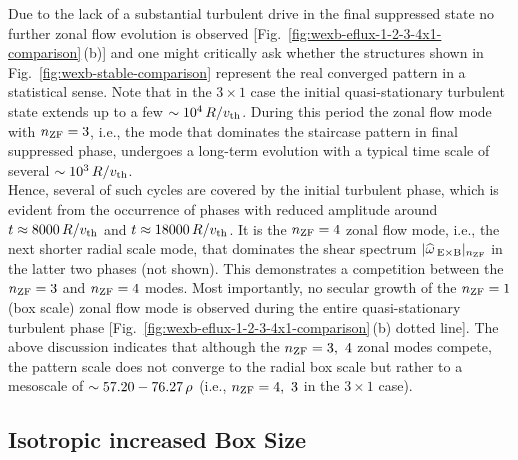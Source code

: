 Due to the lack of a substantial turbulent drive in the final suppressed state no further zonal flow evolution is observed [Fig.~\ref{fig:wexb-eflux-1-2-3-4x1-comparison}\,(b)] and one might critically ask whether the structures shown in Fig.~\ref{fig:wexb-stable-comparison} represent the real converged pattern in a statistical sense. 
Note that in the $3 \times 1$ case the initial quasi-stationary turbulent state extends up to a few $\sim 10^4\,R/v_{\mathrm{th}}$.
During this period the zonal flow mode with $n_\mathrm{ZF} = 3$, i.e., the mode that dominates the staircase pattern in final suppressed phase, undergoes a long-term evolution with a typical time scale of several $\sim 10^3\,R/v_{\mathrm{th}}$. \\
Hence, several of such cycles are covered by the initial turbulent phase, which is evident from the occurrence of phases with reduced amplitude around $t \approx 8000\,R/v_{\mathrm{th}}$ and $t \approx 18000\,    R/v_{\mathrm{th}}$.
It is the $n_\mathrm{ZF} = 4$ zonal flow mode, i.e., the next shorter radial scale mode, that dominates the shear spectrum $|\widehat{\omega}_{\mathrm{\:E \times B}}|_{n_\mathrm{ZF}}$ in the latter two phases (not shown). This demonstrates a competition between the $n_\mathrm{ZF} = 3$ and $n_\mathrm{ZF} = 4$ modes.
Most importantly, no secular growth of the $n_\mathrm{ZF} = 1$ (box scale) zonal flow mode is observed during the entire quasi-stationary turbulent phase [Fig.~\ref{fig:wexb-eflux-1-2-3-4x1-comparison}\,(b) dotted line].
The above discussion indicates that although the $n_\mathrm{ZF} = 3,~4$ zonal modes compete, the pattern scale does not converge to the radial box scale but rather to a mesoscale of $\sim 57.20 - 76.27\,\rho$ (i.e., $n_\mathrm{ZF} = 4,~3$ in the $3\times1$ case). 

\newpage
\subsection{Isotropic increased Box Size}
\label{sub:isotropic}

